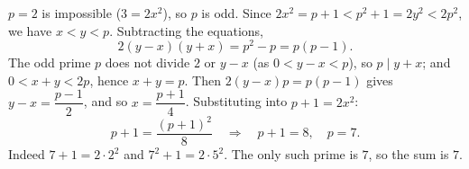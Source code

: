 $p=2$ is impossible ($3=2x^2$), so $p$ is odd. Since $2x^2=p+1<p^2+1=2y^2<2p^2$, we have $x<y<p$. Subtracting the equations,
\[2(y-x)(y+x)=p^2-p=p(p-1).\]
The odd prime $p$ does not divide $2$ or $y-x$ (as $0<y-x<p$), so $p\mid y+x$; and $0<x+y<2p$, hence $x+y=p$. Then $2(y-x)p=p(p-1)$ gives $y-x=\dfrac{p-1}{2}$, and so $x=\dfrac{p+1}{4}$. Substituting into $p+1=2x^2$:
\[p+1=\dfrac{(p+1)^2}{8}\quad\Longrightarrow\quad p+1=8,\quad p=7.\]
Indeed $7+1=2\cdot2^2$ and $7^2+1=2\cdot5^2$. The only such prime is $7$, so the sum is $\boxed{7}$.
